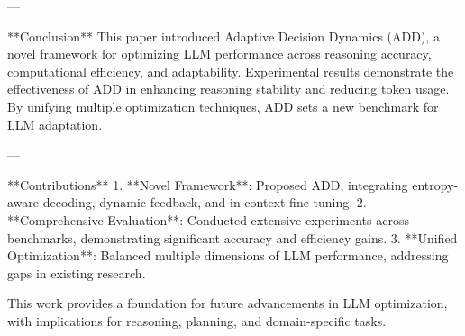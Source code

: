 ---

**Conclusion**  
This paper introduced Adaptive Decision Dynamics (ADD), a novel framework for optimizing LLM performance across reasoning accuracy, computational efficiency, and adaptability. Experimental results demonstrate the effectiveness of ADD in enhancing reasoning stability and reducing token usage. By unifying multiple optimization techniques, ADD sets a new benchmark for LLM adaptation.  

---

**Contributions**  
1. **Novel Framework**: Proposed ADD, integrating entropy-aware decoding, dynamic feedback, and in-context fine-tuning.  
2. **Comprehensive Evaluation**: Conducted extensive experiments across benchmarks, demonstrating significant accuracy and efficiency gains.  
3. **Unified Optimization**: Balanced multiple dimensions of LLM performance, addressing gaps in existing research.  

This work provides a foundation for future advancements in LLM optimization, with implications for reasoning, planning, and domain-specific tasks.  
